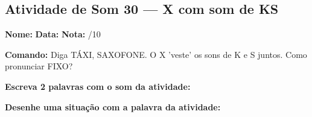 \subsection{Atividade de Som 30 --- X com som de KS}
\begin{exercicio}



\noindent\textbf{Nome:} \underline{\hspace{3.2cm}} \quad \textbf{Data:} \underline{\hspace{1.6cm}} \quad \textbf{Nota:} \underline{\hspace{0.9cm}}/10


\noindent\textbf{Comando:} Diga TÁXI, SAXOFONE. O X 'veste' os sons de K e S juntos. Como pronunciar FIXO?


\begin{center}
\end{center}

\noindent\textbf{Escreva 2 palavras com o som da atividade:}

\begin{center}
  \underline{\hspace{3cm}} \quad \underline{\hspace{3cm}}
\end{center}

\noindent\textbf{Desenhe uma situação com a palavra da atividade:}

\begin{center}
\end{center}

\end{exercicio}



